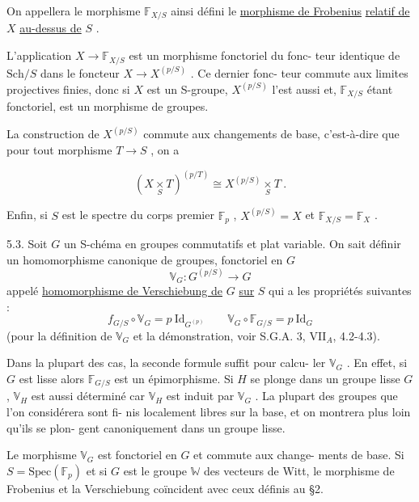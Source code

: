 \documentclass[11pt]{article}
\newcommand{\scanpage}[1]{\par\bigskip\noindent{\small\sffamily[scan #1]}\par}
\newcommand{\mspage}[1]{{\small\sffamily[p.\,#1]}}
\newcommand{\hand}[1]{\textcolor{blue}{#1}}
\newcommand{\uline}[1]{\underline{#1}}
\begin{document}
On appellera le morphisme $\mathbb{F}_{X/S}$ ainsi défini le \uline{morphisme de Frobenius}
\uline{relatif de} $X$ \uline{au-dessus de} $S$ .

L'application $X \to \mathbb{F}_{X/S}$ est un morphisme fonctoriel du fonc-%
teur identique de $\mathrm{Sch}/S$ dans le foncteur $X \to X^{(p/S)}$ . Ce dernier fonc-%
teur commute aux limites projectives finies, donc si $X$ est un S-groupe,
$X^{(p/S)}$ l'est aussi et, $\mathbb{F}_{X/S}$ étant fonctoriel, est un morphisme de groupes.

La construction de $X^{(p/S)}$ commute aux changements de base,
c'est-à-dire que pour tout morphisme $T \to S$ , on a

\mspage{\hand{25}}

\clearpage
\scanpage{129/26}
\[ (X \underset{S}{\times} T)^{(p/T)} \cong X^{(p/S)} \underset{S}{\times} T \ . \]

Enfin, si $S$ est le spectre du corps premier $\mathbb{F}_p$ , $X^{(p/S)} = X$ et
$\mathbb{F}_{X/S} = \mathbb{F}_X$ .

5.3. \quad Soit $G$ un S-chéma en groupes commutatifs et plat variable.
On sait définir un homomorphisme canonique de groupes, fonctoriel en $G$
\[ \mathbb{V}_G : G^{(p/S)} \to G \]
appelé \uline{homomorphisme de Verschiebung de} $G$ \uline{sur} $S$ qui a les propriétés
suivantes :
\[ \boxed{ f_{G/S} \circ \mathbb{V}_G = p \ \mathrm{Id}_{G^{(p)}} \qquad \mathbb{V}_G \circ \mathbb{F}_{G/S} = p \ \mathrm{Id}_G } \]
(pour la définition de $\mathbb{V}_G$ et la démonstration, voir S.G.A. 3, VII$_A$,
4.2-4.3).

Dans la plupart des cas, la seconde formule suffit pour calcu-%
ler $\mathbb{V}_G$ . En effet, si $G$ est lisse alors $\mathbb{F}_{G/S}$ est un épimorphisme. Si
$H$ se plonge dans un groupe lisse $G$ , $\mathbb{V}_H$ est aussi déterminé car $\mathbb{V}_H$
est induit par $\mathbb{V}_G$ . La plupart des groupes que l'on considérera sont fi-%
nis localement libres sur la base, et on montrera plus loin qu'ils se plon-%
gent canoniquement dans un groupe lisse.

Le morphisme $\mathbb{V}_G$ est fonctoriel en $G$ et commute aux change-%
ments de base. Si $S = \mathrm{Spec}(\mathbb{F}_p)$ et si $G$ est le groupe $\mathbb{W}$ des vecteurs
de Witt, le morphisme de Frobenius et la Verschiebung coïncident avec ceux
définis au §2.
\end{document}
